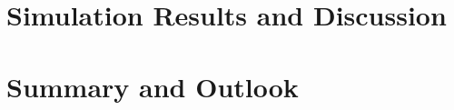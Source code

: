 \documentclass[a4paper, DIV11, abstracton]{scrartcl}
\begin{document}
\section{Simulation Results and Discussion}

\section{Summary and Outlook}




\end{document}
